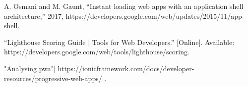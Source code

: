 \documentclass[14pt,a4paper,final]{extreport}
\begin{document}
\begin{thebibliography}{9}
{\fontsize{13pt}{8.4pt}\selectfont A. Osmani and M. Gaunt, “Instant loading web
apps with an application shell architecture,” 2017, https://developers.google.com/web/updates/2015/11/app- shell.\par}\par

{\fontsize{13pt}{8.4pt}\selectfont “Lighthouse Scoring Guide | Tools for Web Developers.” [Online].
Available: https://developers.google.com/web/tools/lighthouse/scoring.\par}\par

{\fontsize{13pt}{8.4pt}\selectfont "Analysing pwa"| https://ionicframework.com/docs/developer-resources/progressive-web-apps/
.\par}\par

\end{thebibliography}
\end{document}
